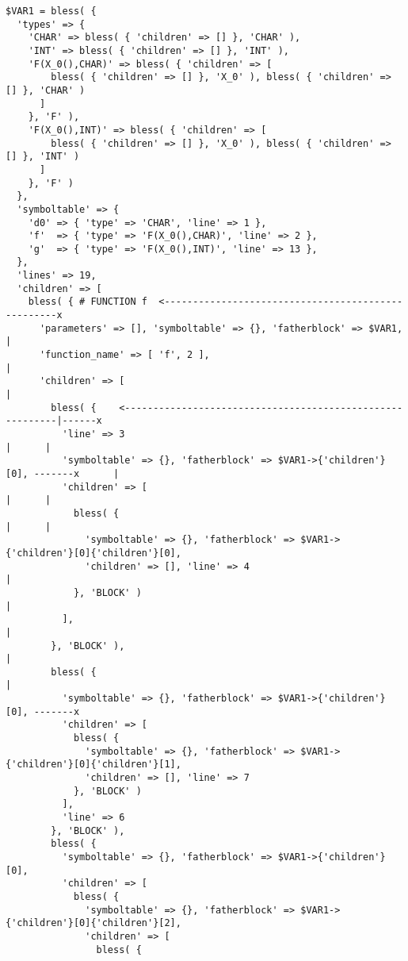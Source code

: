 \begin{verbatim}
$VAR1 = bless( {
  'types' => {
    'CHAR' => bless( { 'children' => [] }, 'CHAR' ),
    'INT' => bless( { 'children' => [] }, 'INT' ),
    'F(X_0(),CHAR)' => bless( { 'children' => [
        bless( { 'children' => [] }, 'X_0' ), bless( { 'children' => [] }, 'CHAR' )
      ]
    }, 'F' ),
    'F(X_0(),INT)' => bless( { 'children' => [
        bless( { 'children' => [] }, 'X_0' ), bless( { 'children' => [] }, 'INT' )
      ]
    }, 'F' )
  },
  'symboltable' => {
    'd0' => { 'type' => 'CHAR', 'line' => 1 },
    'f'  => { 'type' => 'F(X_0(),CHAR)', 'line' => 2 },
    'g'  => { 'type' => 'F(X_0(),INT)', 'line' => 13 },
  },
  'lines' => 19,
  'children' => [
    bless( { # FUNCTION f  <---------------------------------------------------x
      'parameters' => [], 'symboltable' => {}, 'fatherblock' => $VAR1,         |
      'function_name' => [ 'f', 2 ],                                           |
      'children' => [                                                          |
        bless( {    <----------------------------------------------------------|------x
          'line' => 3                                                          |      |
          'symboltable' => {}, 'fatherblock' => $VAR1->{'children'}[0], -------x      |
          'children' => [                                                      |      |
            bless( {                                                           |      |
              'symboltable' => {}, 'fatherblock' => $VAR1->{'children'}[0]{'children'}[0],
              'children' => [], 'line' => 4                                    |
            }, 'BLOCK' )                                                       |
          ],                                                                   |
        }, 'BLOCK' ),                                                          |
        bless( {                                                               |
          'symboltable' => {}, 'fatherblock' => $VAR1->{'children'}[0], -------x 
          'children' => [
            bless( {
              'symboltable' => {}, 'fatherblock' => $VAR1->{'children'}[0]{'children'}[1],
              'children' => [], 'line' => 7
            }, 'BLOCK' )
          ],
          'line' => 6
        }, 'BLOCK' ),
        bless( {
          'symboltable' => {}, 'fatherblock' => $VAR1->{'children'}[0],
          'children' => [
            bless( {
              'symboltable' => {}, 'fatherblock' => $VAR1->{'children'}[0]{'children'}[2],
              'children' => [
                bless( {

\end{verbatim}
